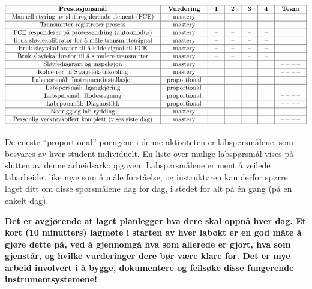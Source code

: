 $$\vbox{\offinterlineskip
\halign{\strut
\vrule \quad\hfil # \ \hfil & 
\vrule \quad\hfil # \ \hfil & 
\vrule \quad\hfil # \ \hfil & 
\vrule \quad\hfil # \ \hfil & 
\vrule \quad\hfil # \ \hfil & 
\vrule \quad\hfil # \ \hfil & 
\vrule \quad\hfil # \ \hfil \vrule \cr
\noalign{\hrule}
%
{\bf Prestasjonsmål} & {\bf Vurdering} & {\bf 1} & {\bf 2} & {\bf 3} & {\bf 4} & {\bf Team} \cr
%
\noalign{\hrule}
%
Manuell styring av sluttregulerende element (FCE) & mastery & -- & -- & -- & -- &  \cr
%
\noalign{\hrule}
%
Transmitter registrerer prosess & mastery & -- & -- & -- & -- &  \cr
%
\noalign{\hrule}
%
FCE responderer på prosessendring (auto-modus) & mastery & -- & -- & -- & -- &  \cr
%
\noalign{\hrule}
%
Bruk sløyfekalibrator for å måle transmittersignal & mastery & -- & -- & -- & -- &  \cr
%
\noalign{\hrule}
%
Bruk sløyfekalibrator til å kilde signal til FCE & mastery & -- & -- & -- & -- &  \cr
%
\noalign{\hrule}
%
Bruk sløyfekalibrator til å simulere transmitter & mastery & -- & -- & -- & -- &  \cr
%
\noalign{\hrule}
%
Sløyfediagram og inspeksjon & mastery &  &  &  &  & -- -- -- -- \cr
%
\noalign{\hrule}
%
Koble rør til Swagelok-tilkobling & mastery &  &  &  &  & -- -- -- -- \cr
%
\noalign{\hrule}
%
Labspørsmål: Instrumentinstallasjon & proportional &  &  &  &  & -- -- -- -- \cr
%
\noalign{\hrule}
%
Labspørsmål: Igangkjøring & proportional &  &  &  &  & -- -- -- -- \cr
%
\noalign{\hrule}
%
Labspørsmål: Hodesregning & proportional &  &  &  &  & -- -- -- -- \cr
%
\noalign{\hrule}
%
Labspørsmål: Diagnostikk & proportional &  &  &  &  & -- -- -- -- \cr
%
\noalign{\hrule}
%
Nedrigg og lab-rydding & mastery & -- & -- & -- & -- &  \cr
%
\noalign{\hrule}
%
Personlig verktøykoffert komplett (vises siste dag) & mastery &  &  &  &  & -- -- -- -- \cr
%
\noalign{\hrule}
} %
}$$ %

De eneste ``proportional''-poengene i denne aktiviteten er labspørsmålene, som besvares av hver student individuelt.  En liste over mulige labspørsmål vises på slutten av denne arbeidsarkoppgaven.  Labspørsmålene er ment å veilede labarbeidet like mye som å måle forståelse, og instruktøren kan derfor spørre laget ditt om disse spørsmålene dag for dag, i stedet for alt på én gang (på en enkelt dag).

\vskip 10pt

{\bf Det er avgjørende at laget planlegger hva dere skal oppnå hver dag.  Et kort (10 minutters) lagmøte i starten av hver labøkt er en god måte å gjøre dette på, ved å gjennomgå hva som allerede er gjort, hva som gjenstår, og hvilke vurderinger dere bør være klare for.  Det er mye arbeid involvert i å bygge, dokumentere og feilsøke disse fungerende instrumentsystemene!}

